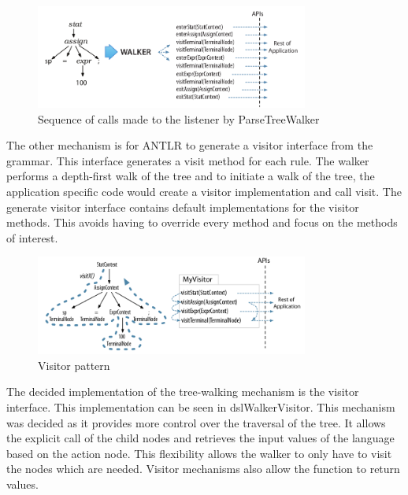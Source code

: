 \begin{figure}[!h]
  \centering
  \includegraphics[width=0.8\textwidth]{images/antlrlistener.png}
  \caption{Sequence of calls made to the listener by ParseTreeWalker \cite{parr2013definitive}}
\end{figure}

The other mechanism is for ANTLR to generate a visitor interface from the grammar. This interface generates a visit method for each rule. The walker performs a depth-first walk of the tree and to initiate a walk of the tree, the application specific code would create a visitor implementation and call visit. The generate visitor interface contains default implementations for the visitor methods. This avoids having to override every method and focus on the methods of interest. \newline \par

\begin{figure}[H]
  \centering
  \includegraphics[width=0.8\textwidth]{images/antlrvisitors.png}
  \caption{Visitor pattern \cite{parr2013definitive}}
\end{figure}

The decided implementation of the tree-walking mechanism is the visitor interface. This implementation can be seen in dslWalkerVisitor. This mechanism was decided as it provides more control over the traversal of the tree. It allows the explicit call of the child nodes and retrieves the input values of the language based on the action node. This flexibility allows the walker to only have to visit the nodes which are needed. Visitor mechanisms also allow the function to return values. \newline \par

